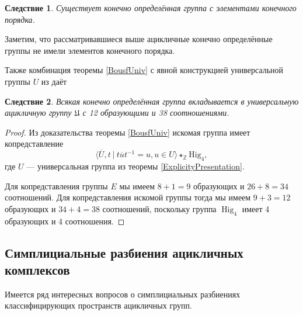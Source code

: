 \documentclass[14pt, dvipsnames, twoside]{extarticle}
\newtheorem{corollary}{Следствие}[theorem]
\theoremstyle{definition}
\theoremstyle{remark}
\DeclareMathOperator{\Hig}{\mathrm{Hig}}
\begin{document}
\begin{corollary}
Существует конечно определённая группа с элементами конечного порядка.
\end{corollary}

Заметим, что рассматривавшиеся выше ацикличные конечно определённые группы не имели элементов конечного порядка. 

Также комбинация теоремы \ref{BousfUniv} с явной конструкцией универсальной группы $U$ из \cite{ExplicityPresentation} даёт

\begin{corollary}\label{AcyclUniv}
Всякая конечно определённая группа вкладывается в универсальную ацикличную группу $\mathfrak{U}$ с 12 образующими и 38 соотношениями.
\end{corollary}  

\begin{proof}
Из доказательства теоремы \ref{BousfUniv} искомая группа имеет копредставление $$\langle \overline{U}, t\ |\ t\overline{u}t^{-1} = u, u\in U  \rangle\star_{\mathbb{Z}} \mathrm{Hig}_4,$$ где $U$ --- универсальная группа из теоремы \ref{ExplicityPresentation}. 

Для копредставления группы $E$ мы имеем $8 + 1 = 9$ образующих и $26 + 8 = 34$ соотношений. Для копредставления искомой группы тогда мы имеем $9 + 3 = 12$ образующих и $34 + 4 = 38$ соотношений, поскольку группа $\Hig_4$ имеет 4 образующих и 4 соотношения. 
\end{proof}


 





























 \iffalse

\subsection{Симплициальные разбиения ацикличных комплексов}


Имеется ряд интересных вопросов о симплициальных разбиениях классифицирующих пространств ацикличных групп.
\end{document}

